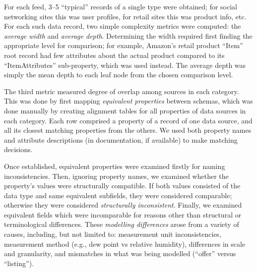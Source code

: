 \documentclass{sigchi}
\begin{document}
For each feed, 3--5 ``typical'' records of a single type were obtained; for social networking sites this was user profiles, for retail sites this was product info, etc.
For each such data record, two simple complexity metrics were computed: the \emph{average width} and \emph{average depth}.  Determining the width required first finding the appropriate level for comparison; for example, Amazon's retail product ``Item'' root record had few attributes about the actual product compared to its ``ItemAttributes'' sub-property, which was used instead. The average depth was simply the mean depth to each leaf node from the chosen comparison level.

The third metric measured degree of overlap among sources in each category.  This was done by first mapping \emph{equivalent properties} between schemas, which was done manually by creating alignment tables for all properties of data sources in each category.  Each row comprised a property of a record of one data source, and all its closest matching properties from the others.  We used both property names and attribute descriptions (in documentation, if available) to make matching decisions.

Once established, equivalent properties were examined firstly for naming inconsistencies.  Then, ignoring property names, we examined whether the property's values were structurally compatible. If both values consisted of the data type and same equivalent subfields, they were considered comparable; otherwise they were considered \emph{structurally inconsistent}.  Finally, we examined equivalent fields which were incomparable for reasons other than structural or terminological differences.  These \emph{modelling differences} arose from a variety of causes, including, but not limited to: measurement unit inconsistencies, measurement method (e.g., dew point vs relative humidity), differences in scale and granularity, and mismatches in what was being modelled (``offer'' versus ``listing'').
\end{document}

